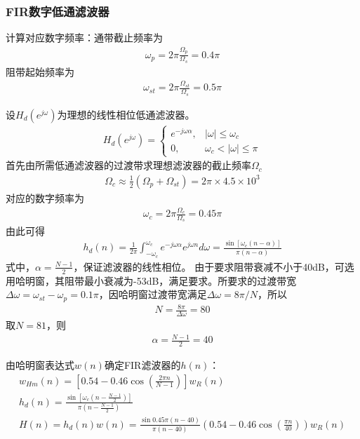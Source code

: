\documentclass{ctexart}
\begin{document}
			\subsubsection{FIR数字低通滤波器}
				计算对应数字频率：通带截止频率为
				\begin{gather}
					\omega_p=2\pi\frac{\Omega_p}{\Omega_s}=0.4\pi
				\end{gather}
				阻带起始频率为
				\begin{gather}
					\omega_{st}=2\pi\frac{\Omega_{st}}{\Omega_s}=0.5\pi
				\end{gather}\par
				设$H_d(e^{j\omega})$为理想的线性相位低通滤波器。
				\begin{gather}
					H_d(e^{j\omega})=
					\begin{cases}
						e^{-j\omega\alpha},&\lvert \omega \rvert\leq \omega_c\\
						0,&\omega_c<\lvert \omega \rvert\leq\pi
					\end{cases}
				\end{gather}
				首先由所需低通滤波器的过渡带求理想滤波器的截止频率$\Omega_c$
				\begin{gather}
					\Omega_c\approx\frac{1}{2}(\Omega_p+\Omega_{st})=2\pi\times4.5\times10^3
				\end{gather}
				对应的数字频率为
				\begin{gather}
					\omega_c=2\pi\frac{\Omega_c}{\Omega_s}=0.45\pi
				\end{gather}
				由此可得
				\begin{gather}
					h_d(n)=\frac{1}{2\pi}\int_{-\omega_c}^{\omega_c}e^{-j\omega\alpha}e^{j\omega n}d\omega=\frac{\sin[\omega_c(n-\alpha)]}{\pi(n-\alpha)}
				\end{gather}			
				式中，$\alpha=\frac{N-1}{2}$，保证滤波器的线性相位。
				由于要求阻带衰减不小于40dB，可选用哈明窗，其阻带最小衰减为-53dB，满足要求。所要求的过渡带宽$\Delta\omega=\omega_{st}-\omega_p=0.1\pi$，因哈明窗过渡带宽满足$\Delta\omega=8\pi/N$，所以
				\begin{gather}
					N=\frac{8\pi}{\Delta\omega}=80
				\end{gather}
				取$N=81$，则
				\begin{gather}
					\alpha=\frac{N-1}{2}=40
				\end{gather}\par
				由哈明窗表达式$w(n)$确定FIR滤波器的$h(n)$：
				\begin{gather}
					w_{Hm}(n)=[0.54-0.46\cos(\frac{2\pi n}{N-1})]w_R(n)\\
					h_d(n)=\frac{\sin[\omega_c(n-\frac{N-1}{2})]}{\pi(n-\frac{N-1}{2})}\\
					H(n)=h_d(n)w(n)=\frac{\sin0.45\pi(n-40)}{\pi(n-40)}(0.54-0.46\cos(\frac{\pi n}{40}))w_R(n)
				\end{gather}	
				
	
			
			
			
			
			
			
			
			
			
			
			
			
			
			
			
			
			
			
			
			
			
			
			
			
			
\end{document}
